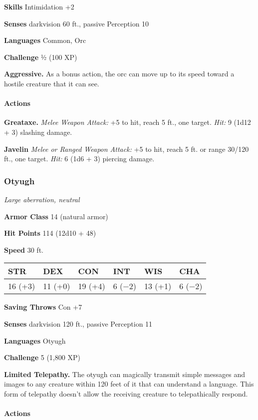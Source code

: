 \documentclass[
]{article}
\begin{document}
\textbf{Skills} Intimidation +2

\textbf{Senses} darkvision 60 ft., passive Perception 10

\textbf{Languages} Common, Orc

\textbf{Challenge} ½ (100 XP)

\textbf{Aggressive.} As a bonus action, the orc can move up to its speed
toward a hostile creature that it can see.

\hypertarget{actions-6}{%
\paragraph{Actions}\label{actions-6}}

\textbf{Greataxe.} \emph{Melee Weapon Attack:} +5 to hit, reach 5 ft.,
one target. \emph{Hit:} 9 (1d12 + 3) slashing damage.

\textbf{Javelin} \emph{Melee or Ranged Weapon Attack:} +5 to hit, reach
5 ft. or range 30/120 ft., one target. \emph{Hit:} 6 (1d6 + 3) piercing
damage.

\hypertarget{otyugh}{%
\subsubsection{Otyugh}\label{otyugh}}

\emph{Large aberration, neutral}

\textbf{Armor Class} 14 (natural armor)

\textbf{Hit Points} 114 (12d10 + 48)

\textbf{Speed} 30 ft.

\begin{longtable}[]{@{}llllll@{}}
\toprule
STR & DEX & CON & INT & WIS & CHA\tabularnewline
\midrule
\endhead
16 (+3) & 11 (+0) & 19 (+4) & 6 (−2) & 13 (+1) & 6 (−2)\tabularnewline
\bottomrule
\end{longtable}

\textbf{Saving Throws} Con +7

\textbf{Senses} darkvision 120 ft., passive Perception 11

\textbf{Languages} Otyugh

\textbf{Challenge} 5 (1,800 XP)

\textbf{Limited Telepathy.} The otyugh can magically transmit simple
messages and images to any creature within 120 feet of it that can
understand a language. This form of telepathy doesn't allow the
receiving creature to telepathically respond.

\hypertarget{actions-7}{%
\paragraph{Actions}\label{actions-7}}
\end{document}
